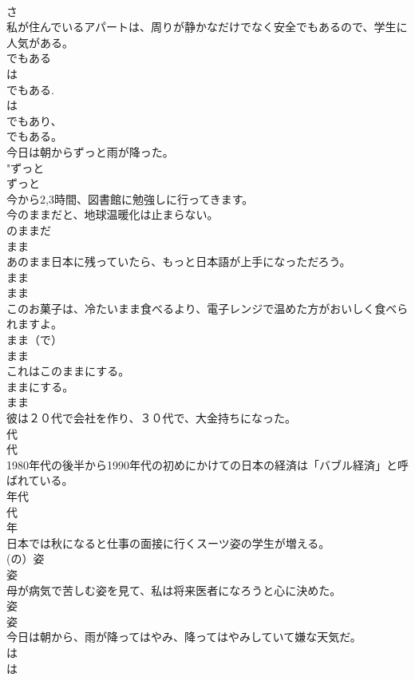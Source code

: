 \documentclass[8pt]{extreport}
\begin{document}
\begin{CJK}{UTF8}{min}
{{\\	さ 
\\	私が住んでいるアパートは、周りが静かなだけでなく安全でもあるので、学生に人気がある。	
\\	でもある 
\\	は 
\\	でもある. 
\\	は 
\\	でもあり、
\\	でもある。 
\\	今日は朝からずっと雨が降った。	
\\	"ずっと 
\\	ずっと 
\\	今から2,3時間、図書館に勉強しに行ってきます。	
\\	今のままだと、地球温暖化は止まらない。	
\\	のままだ 
\\	まま 
\\	あのまま日本に残っていたら、もっと日本語が上手になっただろう。	
\\	まま 
\\	まま 
\\	このお菓子は、冷たいまま食べるより、電子レンジで温めた方がおいしく食べられますよ。	
\\	まま（で）
\\	まま 
\\	これはこのままにする。	
\\	ままにする。 
\\	まま 
\\	彼は２０代で会社を作り、３０代で、大金持ちになった。	
\\	代 
\\	代 
\\	1980年代の後半から1990年代の初めにかけての日本の経済は「バブル経済」と呼ばれている。	
\\	年代 
\\	代 
\\	年 
\\	日本では秋になると仕事の面接に行くスーツ姿の学生が増える。	
\\	(の）姿 
\\	姿 
\\	母が病気で苦しむ姿を見て、私は将来医者になろうと心に決めた。	
\\	姿 
\\	姿 
\\	今日は朝から、雨が降ってはやみ、降ってはやみしていて嫌な天気だ。	
\\	は 
\\	は
}}
\end{CJK}
\end{document}
